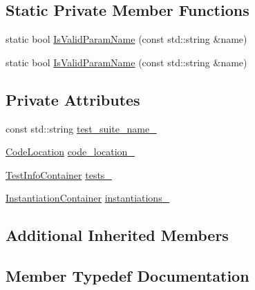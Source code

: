 \subsection*{Static Private Member Functions}
\begin{DoxyCompactItemize}
\item 
static bool \mbox{\hyperlink{classtesting_1_1internal_1_1_parameterized_test_suite_info_a978b6780b449fc1ad63dec758e899679}{Is\+Valid\+Param\+Name}} (const std\+::string \&name)
\item 
static bool \mbox{\hyperlink{classtesting_1_1internal_1_1_parameterized_test_suite_info_a978b6780b449fc1ad63dec758e899679}{Is\+Valid\+Param\+Name}} (const std\+::string \&name)
\end{DoxyCompactItemize}
\subsection*{Private Attributes}
\begin{DoxyCompactItemize}
\item 
const std\+::string \mbox{\hyperlink{classtesting_1_1internal_1_1_parameterized_test_suite_info_a59effa7c65294abcc39772281f97f13f}{test\+\_\+suite\+\_\+name\+\_\+}}
\item 
\mbox{\hyperlink{structtesting_1_1internal_1_1_code_location}{Code\+Location}} \mbox{\hyperlink{classtesting_1_1internal_1_1_parameterized_test_suite_info_a64949444440296996cd9ee66e270a459}{code\+\_\+location\+\_\+}}
\item 
\mbox{\hyperlink{classtesting_1_1internal_1_1_parameterized_test_suite_info_a0578de1b5b1852655771349b785d7fb7}{Test\+Info\+Container}} \mbox{\hyperlink{classtesting_1_1internal_1_1_parameterized_test_suite_info_a44e991246e79e6587ffd35533ab4e2d3}{tests\+\_\+}}
\item 
\mbox{\hyperlink{classtesting_1_1internal_1_1_parameterized_test_suite_info_a65cee35a4b9653272b6017640816eb68}{Instantiation\+Container}} \mbox{\hyperlink{classtesting_1_1internal_1_1_parameterized_test_suite_info_a7334ea96f0aab82af68c36e3c62c49ab}{instantiations\+\_\+}}
\end{DoxyCompactItemize}
\subsection*{Additional Inherited Members}


\subsection{Member Typedef Documentation}
\mbox{\label{classtesting_1_1internal_1_1_parameterized_test_suite_info_a65cee35a4b9653272b6017640816eb68}} 
